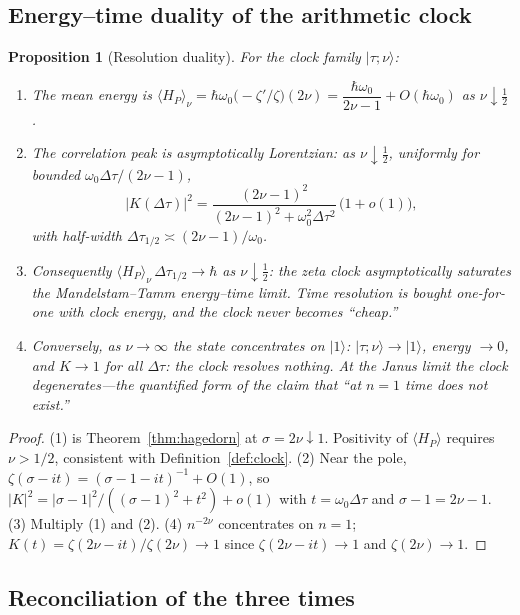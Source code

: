 \documentclass[11pt,a4paper]{article}
\theoremstyle{plain}
\newtheorem{proposition}[theorem]{Proposition}
\theoremstyle{definition}
\theoremstyle{remark}
\newcommand{\ket}[1]{\lvert #1\rangle}
\begin{document}
\subsection{Energy--time duality of the arithmetic clock}

\begin{proposition}[Resolution duality]\label{prop:uncertainty}
For the clock family $\ket{\tau;\nu}$:
\begin{enumerate}[leftmargin=1.6em]
\item The mean energy is
$\langle H_{P}\rangle_{\nu}=\hbar\omega_{0}\bigl(-\zeta'/\zeta\bigr)(2\nu)
=\dfrac{\hbar\omega_{0}}{2\nu-1}+O(\hbar\omega_{0})$ as $\nu\downarrow\tfrac12$.
\item The correlation peak is asymptotically Lorentzian: as $\nu\downarrow\tfrac12$,
uniformly for bounded $\omega_{0}\Delta\tau/(2\nu-1)$,
\begin{equation}
|K(\Delta\tau)|^{2}
=\frac{(2\nu-1)^{2}}{(2\nu-1)^{2}+\omega_{0}^{2}\Delta\tau^{2}}\,\bigl(1+o(1)\bigr),
\end{equation}
with half-width $\Delta\tau_{1/2}\asymp(2\nu-1)/\omega_{0}$.
\item Consequently $\langle H_{P}\rangle_{\nu}\,\Delta\tau_{1/2}\to\hbar$ as
$\nu\downarrow\tfrac12$: the zeta clock asymptotically saturates the
Mandelstam--Tamm energy--time limit. Time resolution is bought one-for-one with clock energy,
and the clock never becomes ``cheap.''
\item Conversely, as $\nu\to\infty$ the state concentrates on $\ket{1}$:
$\ket{\tau;\nu}\to\ket{1}$, energy $\to0$, and $K\to1$ for all $\Delta\tau$: the clock
resolves nothing. At the Janus limit the clock degenerates---the quantified form of the
claim that ``at $n=1$ time does not exist.''
\end{enumerate}
\end{proposition}

\begin{proof}
(1) is Theorem~\ref{thm:hagedorn} at $\sigma=2\nu\downarrow1$. Positivity of $\langle H_P\rangle$ requires $\nu>1/2$, consistent with Definition~\ref{def:clock}. (2) Near the pole,
$\zeta(\sigma-it)=(\sigma-1-it)^{-1}+O(1)$, so
$|K|^{2}=|\sigma-1|^{2}/((\sigma-1)^{2}+t^{2})+o(1)$ with $t=\omega_{0}\Delta\tau$ and
$\sigma-1=2\nu-1$. (3) Multiply (1) and (2). (4) $n^{-2\nu}$ concentrates on $n=1$;
$K(t)=\zeta(2\nu-it)/\zeta(2\nu)\to1$ since $\zeta(2\nu-it)\to1$ and
$\zeta(2\nu)\to1$.
\end{proof}

\subsection{Reconciliation of the three times}
\end{document}
